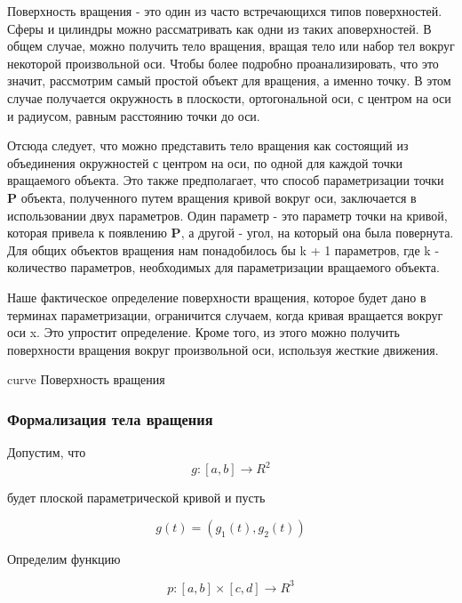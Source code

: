 Поверхность вращения - это один из часто встречающихся типов поверхностей.
Сферы и цилиндры можно рассматривать как одни из таких аповерхностей.
В общем случае, можно получить тело вращения, вращая тело или набор тел вокруг некоторой произвольной оси.
Чтобы более подробно проанализировать, что это значит, рассмотрим самый простой объект для вращения, а именно точку.
В этом случае получается окружность в плоскости, ортогональной оси, с центром на оси и радиусом,
равным расстоянию точки до оси.\newline

Отсюда следует, что можно представить тело вращения как состоящий из объединения окружностей с центром на оси,
по одной для каждой точки вращаемого объекта.
Это также предполагает, что способ параметризации точки \textbf{P} объекта,
полученного путем вращения кривой вокруг оси, заключается в использовании двух параметров.
Один параметр - это параметр точки на кривой, которая привела к появлению \textbf{P},
а другой - угол, на который она была повернута.
Для общих объектов вращения нам понадобилось бы k + 1 параметров, где k - количество параметров,
необходимых для параметризации вращаемого объекта.

Наше фактическое определение поверхности вращения, которое будет дано в терминах параметризации,
ограничится случаем, когда кривая вращается вокруг оси x.
Это упростит определение. Кроме того, из этого можно получить поверхности вращения вокруг произвольной оси,
используя жесткие движения.

\img{100mm}
{curve} %
{Поверхность вращения} %

\subsubsection{Формализация тела вращения}

Допустим, что
\begin{equation}
g: [a, b] \longrightarrow R^2
\end{equation}

будет плоской параметрической кривой и пусть

\begin{equation}
    g(t) = (g_1(t), g_2(t))
\end{equation}

Определим функцию

\begin{equation}
    p: [a, b] \times [c, d] \longrightarrow R^3
\end{equation}

